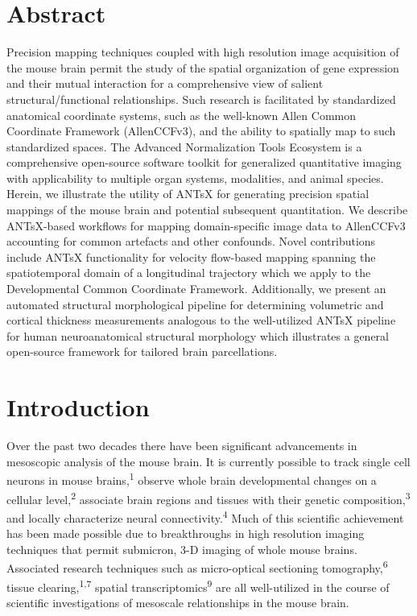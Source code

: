 \documentclass[
  12pt,
]{article}
\begin{document}
\normalsize

\newpage


\hypertarget{abstract}{%
\section*{Abstract}\label{abstract}}

Precision mapping techniques coupled with high resolution image
acquisition of the mouse brain permit the study of the spatial
organization of gene expression and their mutual interaction for a
comprehensive view of salient structural/functional relationships. Such
research is facilitated by standardized anatomical coordinate systems,
such as the well-known Allen Common Coordinate Framework (AllenCCFv3),
and the ability to spatially map to such standardized spaces. The
Advanced Normalization Tools Ecosystem is a comprehensive open-source
software toolkit for generalized quantitative imaging with applicability
to multiple organ systems, modalities, and animal species. Herein, we
illustrate the utility of ANTsX for generating precision spatial
mappings of the mouse brain and potential subsequent quantitation. We
describe ANTsX-based workflows for mapping domain-specific image data to
AllenCCFv3 accounting for common artefacts and other confounds. Novel
contributions include ANTsX functionality for velocity flow-based
mapping spanning the spatiotemporal domain of a longitudinal trajectory
which we apply to the Developmental Common Coordinate Framework.
Additionally, we present an automated structural morphological pipeline
for determining volumetric and cortical thickness measurements analogous
to the well-utilized ANTsX pipeline for human neuroanatomical structural
morphology which illustrates a general open-source framework for
tailored brain parcellations.

\clearpage

\hypertarget{introduction}{%
\section{Introduction}\label{introduction}}

Over the past two decades there have been significant advancements in
mesoscopic analysis of the mouse brain. It is currently possible to
track single cell neurons in mouse brains,\textsuperscript{1} observe
whole brain developmental changes on a cellular
level,\textsuperscript{2} associate brain regions and tissues with their
genetic composition,\textsuperscript{3} and locally characterize neural
connectivity.\textsuperscript{4} Much of this scientific achievement has
been made possible due to breakthroughs in high resolution imaging
techniques that permit submicron, 3-D imaging of whole mouse brains.
Associated research techniques such as micro-optical sectioning
tomography,\textsuperscript{6} tissue clearing,\textsuperscript{1,7}
spatial transcriptomics\textsuperscript{9} are all well-utilized in the
course of scientific investigations of mesoscale relationships in the
mouse brain.
\end{document}
